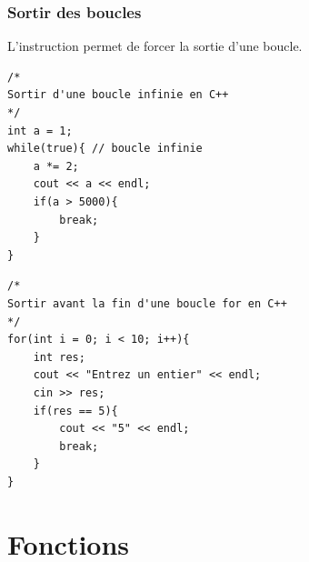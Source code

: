 \begin{frame}[fragile]
    \frametitle{Sortir des boucles}
    L'instruction  permet de forcer la sortie d'une boucle.
    \vfill
    \begin{minipage}{0.37\linewidth}
    \begin{verbatim}
/*
Sortir d'une boucle infinie en C++
*/
int a = 1;
while(true){ // boucle infinie
    a *= 2;
    cout << a << endl;
    if(a > 5000){
        break;
    }
}
    \end{verbatim}
    \end{minipage}
    \hfill
    \begin{minipage}{0.57\linewidth}
    \begin{verbatim}
/*
Sortir avant la fin d'une boucle for en C++
*/
for(int i = 0; i < 10; i++){
    int res;
    cout << "Entrez un entier" << endl;
    cin >> res;
    if(res == 5){
        cout << "5" << endl;
        break;
    }
}
    \end{verbatim}
    \end{minipage}

\end{frame}

\section{Fonctions}

